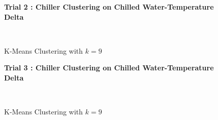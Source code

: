 \begin{figure}[!h]
\centerline{\bfseries\Large Trial 2 : Chiller Clustering on Chilled Water-Temperature Delta}\\
\caption{K-Means Clustering with $k=9$}
\end{figure}
\begin{figure}[!h]
\centerline{\bfseries\Large Trial 3 : Chiller Clustering on Chilled Water-Temperature Delta}\\
\caption{K-Means Clustering with $k=9$}
\end{figure}
